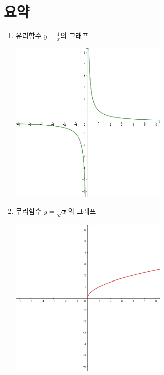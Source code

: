 \documentclass{oblivoir}
\begin{document}
\section*{요약}
\begin{enumerate}[label=\arabic*.,itemsep=15pt]
\item
유리함수 \(y=\frac1x\)의 그래프
\begin{center}
\includegraphics[width=0.6\textwidth]{summary_1-1}
\end{center}
\item
무리함수 \(y=\sqrt x\)의 그래프
\begin{center}
\includegraphics[width=0.6\textwidth]{summary_1-2}
\end{center}
\end{enumerate}
\end{document}
